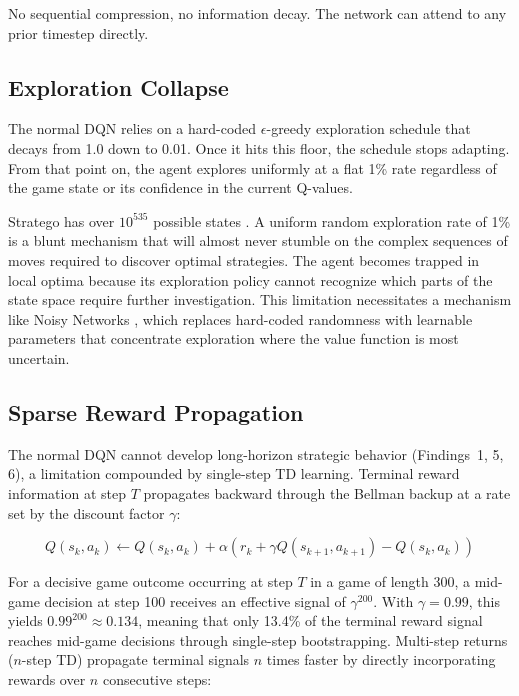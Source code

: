 No sequential compression, no information decay. The network can attend to any prior timestep directly.

\subsection{Exploration Collapse}

The normal DQN relies on a hard-coded $\epsilon$-greedy exploration schedule that decays from 1.0 down to 0.01. Once it hits this floor, the schedule stops adapting. From that point on, the agent explores uniformly at a flat 1\% rate regardless of the game state or its confidence in the current Q-values.

Stratego has over $10^{535}$ possible states \cite{perolat2022stratego}. A uniform random exploration rate of 1\% is a blunt mechanism that will almost never stumble on the complex sequences of moves required to discover optimal strategies. The agent becomes trapped in local optima because its exploration policy cannot recognize which parts of the state space require further investigation. This limitation necessitates a mechanism like Noisy Networks \cite{RainbowJMLR2021}, which replaces hard-coded randomness with learnable parameters that concentrate exploration where the value function is most uncertain.

\subsection{Sparse Reward Propagation}

The normal DQN cannot develop long-horizon strategic behavior (Findings~1, 5, 6), a limitation compounded by single-step TD learning. Terminal reward information at step $T$ propagates backward through the Bellman backup at a rate set by the discount factor $\gamma$:

\begin{equation}
Q(s_k, a_k) \leftarrow Q(s_k, a_k) + \alpha \left( r_k + \gamma Q(s_{k+1}, a_{k+1}) - Q(s_k, a_k) \right)
\end{equation}

For a decisive game outcome occurring at step $T$ in a game of length 300, a mid-game decision at step 100 receives an effective signal of $\gamma^{200}$. With $\gamma = 0.99$, this yields $0.99^{200} \approx 0.134$, meaning that only 13.4\% of the terminal reward signal reaches mid-game decisions through single-step bootstrapping. Multi-step returns ($n$-step TD) \cite{RainbowJMLR2021} propagate terminal signals $n$ times faster by directly incorporating rewards over $n$ consecutive steps:

